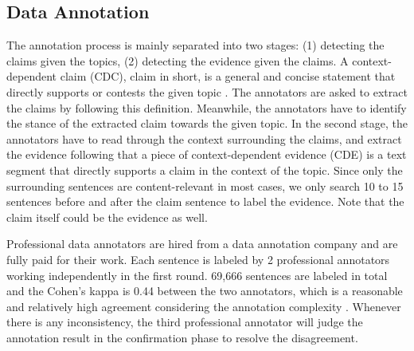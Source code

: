 \documentclass[11pt]{article}
\begin{document}
\begin{table}[t!]
	\centering
{}
\caption{Dataset statistics on argument lengths and vocabulary sharing.}
	\label{tab:data3}
\end{table}


\subsection{Data Annotation}
\label{sec:data_annotation}
The annotation process is mainly separated into two stages: (1) detecting the claims given the topics, (2) detecting the evidence given the claims.
A context-dependent claim (CDC), claim in short, is a general and concise statement that directly supports or contests the given topic \cite{levy2014context}.
The annotators are asked to extract the claims by following this definition. 
Meanwhile, the annotators have to identify the stance of the extracted claim towards the given topic.
In the second stage, the annotators have to read through the context surrounding the claims, and extract the evidence following that a piece of context-dependent evidence (CDE) is a text segment that directly supports a claim in the context of the topic.
Since only the surrounding sentences are content-relevant in most cases, we only search 10 to 15 sentences before and after the claim sentence to label the evidence.
Note that the claim itself could be the evidence as well.

Professional data annotators are hired from a data annotation company and are fully paid for their work.
Each sentence is labeled by 2 professional annotators working independently in the first round.
69,666 sentences are labeled in total and the Cohen's kappa is 0.44 between the two annotators, which is a reasonable and relatively high agreement considering the annotation complexity \cite{aharoni2014benchmark, levy2014context}.
Whenever there is any inconsistency, the third professional annotator will judge the annotation result in the confirmation phase to resolve the disagreement.
\end{document}
